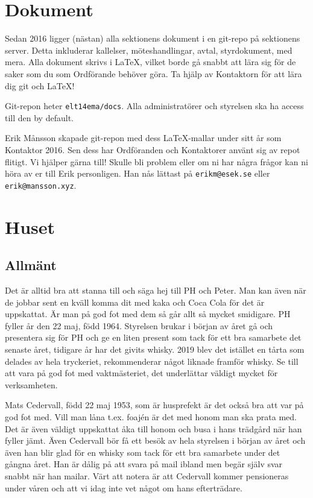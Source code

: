 \documentclass[10pt]{article}
\begin{document}
    \section{Dokument}
    
    Sedan 2016 ligger (nästan) alla sektionens dokument i en git-repo på sektionens server. Detta inkluderar kallelser, möteshandlingar, avtal, styrdokument, med mera. Alla dokument skrivs i \LaTeX, vilket borde gå snabbt att lära sig för de saker som du som Ordförande behöver göra. Ta hjälp av Kontaktorn för att lära dig git och \LaTeX!
    
    Git-repon heter \texttt{elt14ema/docs}. Alla administratörer och styrelsen ska ha access till den by default.
    
    Erik Månsson skapade git-repon med dess \LaTeX-mallar under sitt år som Kontaktor 2016. Sen dess har Ordföranden och Kontaktorer använt sig av repot flitigt. Vi hjälper gärna till! Skulle bli problem eller om ni har några frågor kan ni höra av er till Erik personligen. Han nås lättast på \texttt{erikm@esek.se} eller \texttt{erik@mansson.xyz}.
    
    \section{Huset}
    
    \subsection{Allmänt}
    
    Det är alltid bra att stanna till och säga hej till PH och Peter. Man kan även när de jobbar sent en kväll komma dit med kaka och Coca Cola för det är uppskattat. Är man på god fot med dem så går allt så mycket smidigare. PH fyller år den 22 maj, född 1964. Styrelsen brukar i början av året gå och presentera sig för PH och ge en liten present som tack för ett bra samarbete det senaste året, tidigare år har det givits whisky. 2019 blev det istället en tårta som delades av hela tryckeriet, rekommenderar något liknade framför whisky. Se till att vara på god fot med vaktmästeriet, det underlättar väldigt mycket för verksamheten.
    
    Mats Cedervall, född 22 maj 1953, som är husprefekt är det också bra att var på god fot med. Vill man låna t.ex. foajén är det med honom man ska prata med. Det är även väldigt uppskattat åka till honom och busa i hans trädgård när han fyller jämt. Även Cedervall bör få ett besök av hela styrelsen i början av året och även han blir glad för en whisky som tack för ett bra samarbete under det gångna året. Han är dålig på att svara på mail ibland men begär själv svar snabbt när han mailar. Värt att notera är att Cedervall kommer pensioneras under våren och att vi idag inte vet något om hans efterträdare.
    
\end{document}
